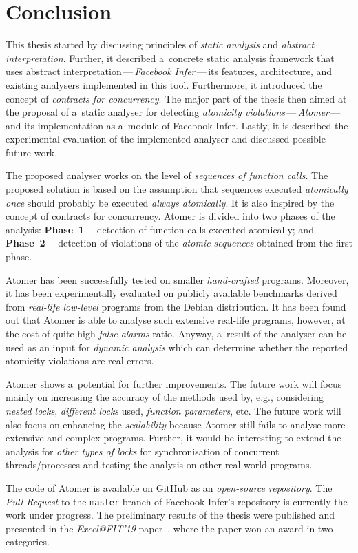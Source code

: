 \chapter{Conclusion}
\label{chap:conc}

This thesis started by discussing principles of \emph{static analysis} and
\emph{abstract interpretation}. Further, it described a~concrete static 
analysis framework that uses abstract interpretation\,---\,\emph{Facebook
Infer}\,---\,its features, architecture, and existing analysers implemented
in this tool. Furthermore, it introduced the concept of
\emph{contracts for concurrency}. The major part of the thesis then aimed 
at the proposal of a~static analyser for detecting \emph{atomicity
violations}\,---\,\emph{Atomer}\,---\,and its implementation as a~module
of Facebook Infer. Lastly, it is described the experimental evaluation of
the implemented analyser and discussed possible future work.

The proposed analyser works on the level of \emph{sequences of function 
calls}. The proposed solution is based on the assumption that sequences 
executed \emph{atomically once} should probably be executed \emph{always
atomically}. It is also inspired by the concept of contracts for concurrency.
Atomer is divided into two phases of the analysis:
\textbf{Phase~1}\,---\,detection of function calls executed atomically; and
\textbf{Phase~2}\,---\,detection of violations of the \emph{atomic sequences}
obtained from the first phase.

Atomer has been successfully tested on smaller \emph{hand-crafted}
programs. Moreover, it has been experimentally evaluated on publicly
available benchmarks derived from \emph{real-life low-level} programs
from the Debian distribution. It has been found out that Atomer is able 
to analyse such extensive real-life programs, however, at the cost of quite
high \emph{false alarms} ratio. Anyway, a~result of the analyser can be 
used as an input for \emph{dynamic analysis} which can determine whether 
the reported atomicity violations are real errors.

Atomer shows a~potential for further improvements. The future work will
focus mainly on increasing the accuracy of the methods used by, e.g.,
considering \emph{nested locks}, \emph{different locks} used,
\emph{function parameters}, etc. The future work will also focus
on enhancing the \emph{scalability} because Atomer still fails to analyse more
extensive and complex programs. Further, it would be interesting to
extend the analysis for \emph{other types of locks} for synchronisation
of concurrent threads/processes and testing the analysis on other
real-world programs.

The code of Atomer is available on GitHub as an \emph{open-source
repository}. The \emph{Pull Request} to the \texttt{master} branch
of Facebook Infer's repository is currently the work under progress.
The preliminary results of the thesis were published and presented in
the \emph{Excel@FIT'19} paper~\cite{excel2019FBInfer}, where the paper won 
an award in two categories.



